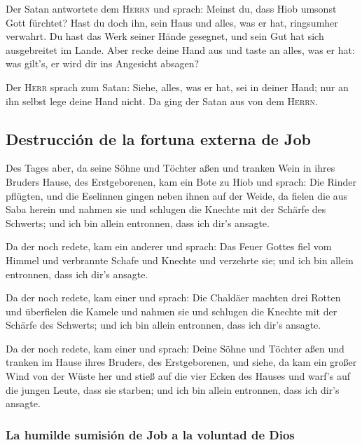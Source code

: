  Der Satan antwortete dem \textsc{Herrn} und sprach:
Meinst du, dass Hiob umsonst Gott fürchtet?  Hast du doch
ihn, sein Haus und alles, was er hat, ringsumher verwahrt. Du hast das
Werk seiner Hände gesegnet, und sein Gut hat sich ausgebreitet im Lande.
 Aber recke deine Hand aus und taste an alles, was er
hat: was gilt's, er wird dir ins Angesicht absagen?

 Der \textsc{Herr} sprach zum Satan: Siehe, alles, was er
hat, sei in deiner Hand; nur an ihn selbst lege deine Hand nicht. Da
ging der Satan aus von dem \textsc{Herrn}.

\hypertarget{destrucciuxf3n-de-la-fortuna-externa-de-job}{%
\subsection{Destrucción de la fortuna externa de
Job}\label{destrucciuxf3n-de-la-fortuna-externa-de-job}}

 Des Tages aber, da seine Söhne und Töchter aßen und
tranken Wein in ihres Bruders Hause, des Erstgeborenen, 
kam ein Bote zu Hiob und sprach: Die Rinder pflügten, und die Eselinnen
gingen neben ihnen auf der Weide,  da fielen die aus Saba
herein und nahmen sie und schlugen die Knechte mit der Schärfe des
Schwerts; und ich bin allein entronnen, dass ich dir's ansagte.

 Da der noch redete, kam ein anderer und sprach: Das
Feuer Gottes fiel vom Himmel und verbrannte Schafe und Knechte und
verzehrte sie; und ich bin allein entronnen, dass ich dir's ansagte.

 Da der noch redete, kam einer und sprach: Die Chaldäer
machten drei Rotten und überfielen die Kamele und nahmen sie und
schlugen die Knechte mit der Schärfe des Schwerts; und ich bin allein
entronnen, dass ich dir's ansagte.

 Da der noch redete, kam einer und sprach: Deine Söhne
und Töchter aßen und tranken im Hause ihres Bruders, des Erstgeborenen,
 und siehe, da kam ein großer Wind von der Wüste her und
stieß auf die vier Ecken des Hauses und warf's auf die jungen Leute,
dass sie starben; und ich bin allein entronnen, dass ich dir's ansagte.

\hypertarget{la-humilde-sumisiuxf3n-de-job-a-la-voluntad-de-dios}{%
\subsubsection{La humilde sumisión de Job a la voluntad de
Dios}\label{la-humilde-sumisiuxf3n-de-job-a-la-voluntad-de-dios}}

